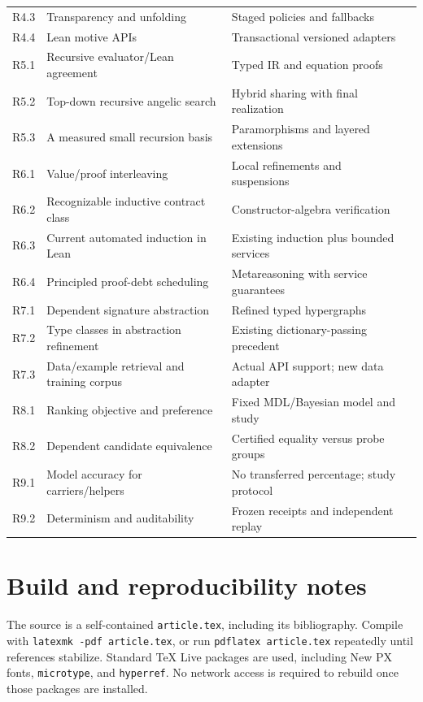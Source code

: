 \documentclass[11pt,a4paper]{article}
\newcommand{\code}[1]{\nolinkurl{#1}}
\theoremstyle{remark}
\begin{document}
\begin{longtable}{@{}P{14mm}P{76mm}P{46mm}P{10mm}@{}}
R4.3 & Transparency and unfolding & Staged policies and fallbacks & \pageref{q43}\\
R4.4 & Lean motive APIs & Transactional versioned adapters & \pageref{q44}\\
R5.1 & Recursive evaluator/Lean agreement & Typed IR and equation proofs & \pageref{q51}\\
R5.2 & Top-down recursive angelic search & Hybrid sharing with final realization & \pageref{q52}\\
R5.3 & A measured small recursion basis & Paramorphisms and layered extensions & \pageref{q53}\\
R6.1 & Value/proof interleaving & Local refinements and suspensions & \pageref{q61}\\
R6.2 & Recognizable inductive contract class & Constructor-algebra verification & \pageref{q62}\\
R6.3 & Current automated induction in Lean & Existing induction plus bounded services & \pageref{q63}\\
R6.4 & Principled proof-debt scheduling & Metareasoning with service guarantees & \pageref{q64}\\
R7.1 & Dependent signature abstraction & Refined typed hypergraphs & \pageref{q71}\\
R7.2 & Type classes in abstraction refinement & Existing dictionary-passing precedent & \pageref{q72}\\
R7.3 & Data/example retrieval and training corpus & Actual API support; new data adapter & \pageref{q73}\\
R8.1 & Ranking objective and preference & Fixed MDL/Bayesian model and study & \pageref{q81}\\
R8.2 & Dependent candidate equivalence & Certified equality versus probe groups & \pageref{q82}\\
R9.1 & Model accuracy for carriers/helpers & No transferred percentage; study protocol & \pageref{q91}\\
R9.2 & Determinism and auditability & Frozen receipts and independent replay & \pageref{q92}\\
\bottomrule
\end{longtable}

\section{Build and reproducibility notes}

The source is a self-contained \code{article.tex}, including its bibliography. Compile with \code{latexmk -pdf article.tex}, or run \code{pdflatex article.tex} repeatedly until references stabilize. Standard TeX Live packages are used, including New PX fonts, \code{microtype}, and \code{hyperref}. No network access is required to rebuild once those packages are installed.
\end{document}
